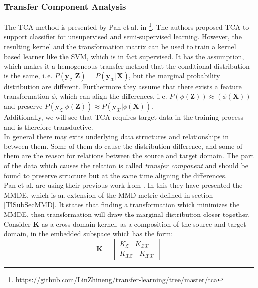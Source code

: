 \subsubsection{Transfer Component Analysis}
The \acs{TCA} method is presented by Pan et al. in \cite{Pan.2011}\footnote{\url{https://github.com/LinZhineng/transfer-learning/tree/master/tca}}.
The authors proposed \acs{TCA} to support classifier for unsupervised and semi-supervised learning.\cite{Pan.2011}
However, the resulting kernel and the transformation matrix can be used to train a kernel based learner like the \acs{SVM}, which is in fact supervised.
It has the assumption, which makes it a homogeneous transfer method that the conditional distribution is the same, i.\,e. $ P(\mathbf{y}_\mathcal{Z}\vert \mathbf{Z}) = P(\mathbf{y}_\mathcal{X}\vert \mathbf{X})$, but the marginal probability distribution are different.
Furthermore they assume that there exists a feature transformation $\phi$, which can align the differences, i.\,e. $P(\phi(\mathbf{Z})) \approx(\phi(\mathbf{X}))$ and preserve $P(\mathbf{y}_\mathcal{Z}\vert \phi(\mathbf{Z}))\approx P(\mathbf{y}_\mathcal{X}\vert \phi(\mathbf{X}))$.\cite{Pan.2011}\\
Additionally, we will see that \acs{TCA} requires target data in the training process and is therefore transductive.\\
In general there may exits underlying data structures and relationships in between them.
Some of them do cause the distribution difference, and some of them are the reason for relations between the source and target domain.
The part of the data which causes the relation is called \textit{transfer component} and should be found to preserve structure but at the same time aligning the differences.\cite{Pan.2011}\\
Pan et al. are using their previous work from \cite{Pan.2008}.
In this they have presented the \ac{MMDE}, which is an extension of the \acs{MMD} metric defined in section \ref{TlSubSecMMD}.
It states that finding a transformation which minimizes the \acs{MMDE}, then transformation will draw the marginal distribution closer together.\\
Consider $\mathbf{K}$ as a cross-domain kernel, as a composition of the source and target domain, in the embedded subspace which has the form:\cite{Pan.2011}
\begin{equation}\label{EqTCAKernel}
\mathbf{K} = 
	\begin{bmatrix}
	K_{\mathcal{Z}}\>\>\>\> K_{\mathcal{ZX}} \\
	K_{\mathcal{XZ}}\>\>\>\> K_{\mathcal{XX}}
	\end{bmatrix}
\end{equation}
